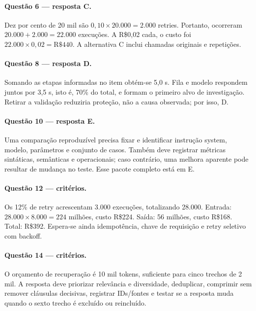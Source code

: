 \paragraph{Questão 6 --- resposta C.} Dez por cento de 20 mil são $0{,}10\times20.000=2.000$ retries. Portanto, ocorreram $20.000+2.000=22.000$ execuções. A R\$0,02 cada, o custo foi $22.000\times0{,}02=\text{R\$}440$. A alternativa C inclui chamadas originais e repetições.

\paragraph{Questão 8 --- resposta D.} Somando as etapas informadas no item obtém-se 5,0 s. Fila e modelo respondem juntos por 3,5 s, isto é, 70\% do total, e formam o primeiro alvo de investigação. Retirar a validação reduziria proteção, não a causa observada; por isso, D.

\paragraph{Questão 10 --- resposta E.} Uma comparação reproduzível precisa fixar e identificar instrução system, modelo, parâmetros e conjunto de casos. Também deve registrar métricas sintáticas, semânticas e operacionais; caso contrário, uma melhora aparente pode resultar de mudança no teste. Esse pacote completo está em E.

\paragraph{Questão 12 --- critérios.} Os 12\% de retry acrescentam 3.000 execuções, totalizando 28.000. Entrada: $28.000\times8.000=224$ milhões, custo R\$224. Saída: 56 milhões, custo R\$168. Total: R\$392. Espera-se ainda idempotência, chave de requisição e retry seletivo com backoff.

\paragraph{Questão 14 --- critérios.} O orçamento de recuperação é 10 mil tokens, suficiente para cinco trechos de 2 mil. A resposta deve priorizar relevância e diversidade, deduplicar, comprimir sem remover cláusulas decisivas, registrar IDs/fontes e testar se a resposta muda quando o sexto trecho é excluído ou reincluído.
